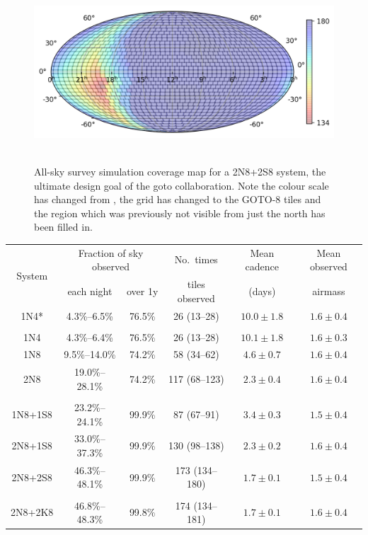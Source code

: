 \begin{colsection}
\begin{colsection}
\begin{figure}[p]
    \begin{center}
        \includegraphics[height=190pt]{images/survey_sims/365_2N8+2S8_lite.png}
    \end{center}
    \caption[All-sky survey simulation results: 2N8+2S8 system]{
        All-sky survey simulation coverage map for a 2N8+2S8 system, the ultimate design goal of the \gls{goto} collaboration. Note the colour scale has changed from , the grid has changed to the GOTO-8 tiles and the region which was previously not visible from just the north has been filled in.
    }\label{fig:survey_sim_2n8+2s8}
\end{figure}


\clearpage

\begin{table}[t]
    \begin{center}
    \begin{tabular}{c|cc|c|c|c} %

    \multirow{2}{*}{System} &
    \multicolumn{2}{c|}{Fraction of sky observed} &
    No.\ times &
    Mean cadence &
    Mean observed
    \\
    &
    each night &
    over 1y &
    tiles observed &
    (days) &
    airmass
    \\
    \midrule
    1N4* & 4.3\%--6.5\% & 76.5\% & 26 (13--28) & $10.0\pm1.8$ & $1.6\pm0.4$ \\
    &&&&&\\
    1N4 & 4.3\%--6.4\% & 76.5\% & 26 (13--28) & $10.1\pm1.8$ & $1.6\pm0.3$ \\
    1N8 & 9.5\%--14.0\% & 74.2\% & 58 (34--62) & $4.6\pm0.7$ & $1.6\pm0.4$ \\
    2N8 & 19.0\%--28.1\% & 74.2\% & 117 (68--123) & $2.3\pm0.4$ & $1.6\pm0.4$ \\
    &&&&&\\
    1N8+1S8 & 23.2\%--24.1\% & 99.9\% & 87 (67--91) & $3.4\pm0.3$ & $1.5\pm0.4$ \\
    2N8+1S8 & 33.0\%--37.3\% & 99.9\% & 130 (98--138) & $2.3\pm0.2$ & $1.6\pm0.4$ \\
    2N8+2S8 & 46.3\%--48.1\% & 99.9\% & 173 (134--180) & $1.7\pm0.1$ & $1.5\pm0.4$ \\
    &&&&&\\
    2N8+2K8 & 46.8\%--48.3\% & 99.8\% & 174 (134--181) & $1.7\pm0.1$ & $1.6\pm0.4$ \\


\end{tabular}
\end{center}
\end{table}
\end{colsection}
\end{colsection}
